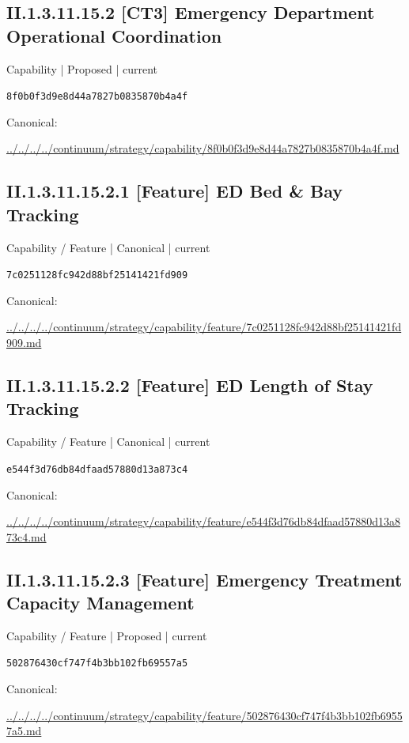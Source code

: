 \documentclass[10pt,a4paper]{article}
\begin{document}
\subsection*{II.1.3.11.15.2 [CT3] Emergency Department Operational Coordination}
{\small Capability | Proposed | current}\par
\texttt{8f0b0f3d9e8d44a7827b0835870b4a4f}\par
Canonical: \par
{\footnotesize\url{../../../../continuum/strategy/capability/8f0b0f3d9e8d44a7827b0835870b4a4f.md}}\par
\subsection*{II.1.3.11.15.2.1 [Feature] ED Bed \& Bay Tracking}
{\small Capability / Feature | Canonical | current}\par
\texttt{7c0251128fc942d88bf25141421fd909}\par
Canonical: \par
{\footnotesize\url{../../../../continuum/strategy/capability/feature/7c0251128fc942d88bf25141421fd909.md}}\par
\subsection*{II.1.3.11.15.2.2 [Feature] ED Length of Stay Tracking}
{\small Capability / Feature | Canonical | current}\par
\texttt{e544f3d76db84dfaad57880d13a873c4}\par
Canonical: \par
{\footnotesize\url{../../../../continuum/strategy/capability/feature/e544f3d76db84dfaad57880d13a873c4.md}}\par
\subsection*{II.1.3.11.15.2.3 [Feature] Emergency Treatment Capacity Management}
{\small Capability / Feature | Proposed | current}\par
\texttt{502876430cf747f4b3bb102fb69557a5}\par
Canonical: \par
{\footnotesize\url{../../../../continuum/strategy/capability/feature/502876430cf747f4b3bb102fb69557a5.md}}\par
\end{document}
